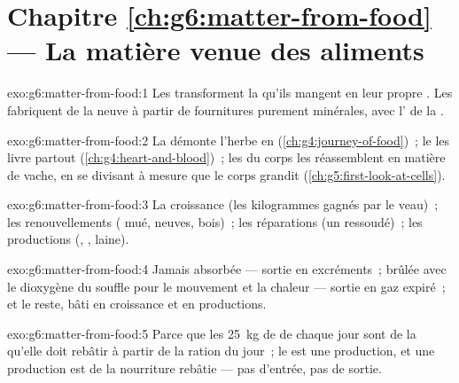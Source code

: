 \section*{Chapitre \ref{ch:g6:matter-from-food} --- La matière venue des aliments}

\begin{solution}{exo:g6:matter-from-food:1}
Les  transforment la  qu'ils mangent
en leur propre . Les  fabriquent de la
 neuve à partir de fournitures purement minérales,
avec l' de la .
\end{solution}

\begin{solution}{exo:g6:matter-from-food:2}
La  démonte l'herbe en 
(\cref{ch:g4:journey-of-food})~; le  les livre partout
(\cref{ch:g4:heart-and-blood})~; les  du corps les
réassemblent en matière de vache, en se divisant à mesure que le
corps grandit (\cref{ch:g5:first-look-at-cells}).
\end{solution}

\begin{solution}{exo:g6:matter-from-food:3}
La croissance (les kilogrammes gagnés par le veau)~; les
renouvellements ( mué,  neuves, bois)~; les réparations
(un  ressoudé)~; les productions (, , laine).
\end{solution}

\begin{solution}{exo:g6:matter-from-food:4}
Jamais absorbée --- sortie en excréments~; brûlée avec le dioxygène
du souffle pour le mouvement et la chaleur --- sortie en gaz
expiré~; et le reste, bâti en croissance et en productions.
\end{solution}

\begin{solution}{exo:g6:matter-from-food:5}
Parce que les \qty{25}{kg} de  de chaque jour sont de la  qu'elle doit rebâtir à partir de la ration du jour~; le
 est une production, et une production est de la nourriture
rebâtie --- pas d'entrée, pas de sortie.
\end{solution}

